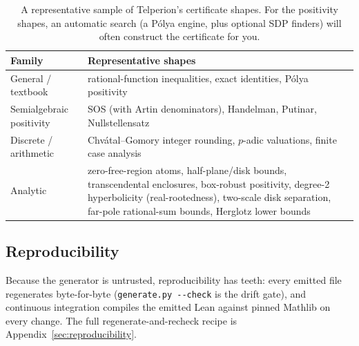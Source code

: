 \begin{table}[t]
  \centering
  \begin{tabular}{@{}l p{}@{}}
    \toprule
    Family & Representative shapes \\
    \midrule
    General / textbook & rational-function inequalities, exact identities,
      P\'olya positivity \\
    Semialgebraic positivity & SOS (with Artin denominators), Handelman, Putinar,
      Nullstellensatz \cite{positivstellensatz,lasserre_sos} \\
    Discrete / arithmetic & Chv\'atal--Gomory integer rounding, $p$-adic
      valuations, finite case analysis \\
    Analytic & zero-free-region atoms, half-plane/disk bounds, transcendental
      enclosures, box-robust positivity, degree-2 hyperbolicity (real-rootedness),
      two-scale disk separation, far-pole rational-sum bounds, Herglotz lower bounds \\
    \bottomrule
  \end{tabular}
  \caption{A representative sample of Telperion's certificate shapes. For the
    positivity shapes, an automatic search (a P\'olya engine, plus optional SDP
    finders) will often construct the certificate for you.}
  \label{tab:shapes}
\end{table}

\subsection{Reproducibility}

Because the generator is untrusted, reproducibility has teeth: every emitted file
regenerates byte-for-byte (\texttt{generate.py -{}-check} is the drift gate), and
continuous integration compiles the emitted Lean against pinned Mathlib on every
change. The full regenerate-and-recheck recipe is Appendix~\ref{sec:reproducibility}.
